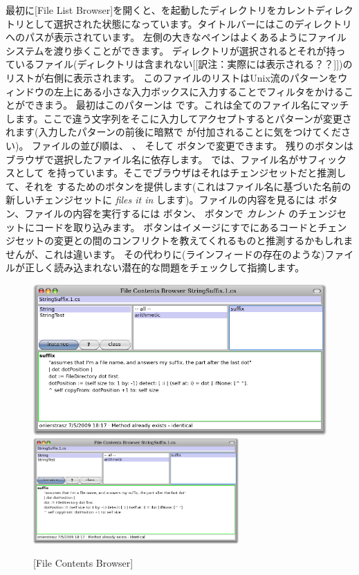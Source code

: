 \documentclass[a4paper,10pt,twoside]{book}
\begin{document}
最初に[File List Browser]を開くと、\pharo を起動したディレクトリをカレントディレクトリとして選択された状態になっています。タイトルバーにはこのディレクトリへのパスが表示されています。
左側の大きなペインはよくあるようにファイルシステムを渡り歩くことができます。
ディレクトリが選択されるとそれが持っているファイル(ディレクトリは含まれない[[訳注：実際には表示される？？]])のリストが右側に表示されます。
このファイルのリストはUnix流のパターンをウィンドウの左上にある小さな入力ボックスに入力することでフィルタをかけることができまう。
最初はこのパターンは \ct{*} です。これは全てのファイル名にマッチします。ここで違う文字列をそこに入力してアクセプトするとパターンが変更されます(入力したパターンの前後に暗黙で \ct{*} が付加されることに気をつけてください)。
ファイルの並び順は、 、  そして  ボタンで変更できます。
残りのボタンはブラウザで選択したファイル名に依存します。
 では、ファイル名がサフィックスとして  を持っています。そこでブラウザはそれはチェンジセットだと推測して、それを  するためのボタンを提供します(これはファイル名に基づいた名前の新しいチェンジセットに \textit{files it in} します)。ファイルの内容を見るには  ボタン、ファイルの内容を実行するには  ボタン、 ボタンで \emph{カレント} のチェンジセットにコードを取り込みます。
 ボタンはイメージにすでにあるコードとチェンジセットの変更との間のコンフリクトを教えてくれるものと推測するかもしれませんが、これは違います。
その代わりに(ラインフィードの存在のような)ファイルが正しく読み込まれない潜在的な問題をチェックして指摘します。

\begin{figure}[btp]
	\begin{center}
	\ifluluelse
		{\includegraphics[width=\textwidth]{fileContentsBrowser}}
		{\includegraphics[width=0.7\textwidth]{fileContentsBrowser}}
	\end{center}
	\caption{[File Contents Browser]}
\end{figure}
\end{document}
